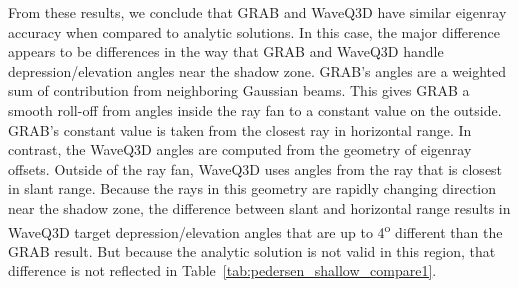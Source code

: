 \documentclass{ws-jca}
\begin{document}
From these results, we conclude that GRAB and WaveQ3D have similar eigenray
accuracy when compared to analytic solutions. In this case, the major
difference appears to be differences in the way that GRAB and WaveQ3D
handle depression/elevation angles near the shadow zone. GRAB's angles are a
weighted sum of contribution from neighboring Gaussian beams. This gives
GRAB a smooth roll-off from angles inside the ray fan to a constant value
on the outside. GRAB's constant value is taken from the closest ray in
horizontal range. In contrast, the WaveQ3D angles are computed from the
geometry of eigenray offsets. Outside of the ray fan, WaveQ3D uses angles from
the ray that is closest in slant range. Because the rays in this geometry
are rapidly changing direction near the shadow zone, the difference between
slant and horizontal range results in WaveQ3D target depression/elevation
angles that are up to 4\textsuperscript{o} different than the GRAB result.
But because the analytic solution is not valid in this region, that
difference is not reflected in Table~\ref{tab:pedersen_shallow_compare1}.
\end{document}
